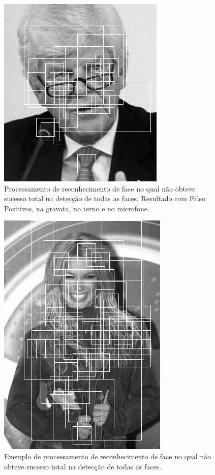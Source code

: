\documentclass[aspectratio=169, xcolor=dvipsnames]{beamer}
\begin{document}
	\begin{frame}
		\begin{figure}[h]
			\centering
			\includegraphics[width=0.4\linewidth]{img/detect_4.jpg}
			\caption{Processamento de reconhecimento de face no qual não obteve sucesso total na detecção de todas as faces. Resultado com Falso Positivos, na gravata, no terno e no microfone.}
			\label{fig:detect_4}
		\end{figure}
	\end{frame}
	
	\begin{frame}
		\begin{figure}[ht]
			\centering
			\includegraphics[width=0.4\linewidth]{img/detect_5.jpg}
			\caption{Exemplo de processamento de reconhecimento de face no qual não obteve sucesso total na detecção de todas as faces.}
			\label{fig:detect_5}
		\end{figure}
	\end{frame}
\end{document}
